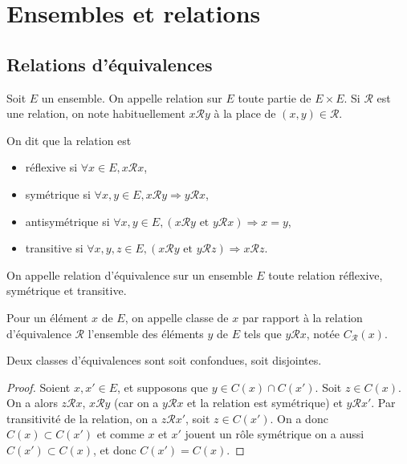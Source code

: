 \section{Ensembles et relations}

\subsection{Relations d'équivalences}

\begin{de}
Soit $E$ un ensemble. On appelle relation sur $E$ toute
partie de $E \times E$. Si $\mathcal{R}$ est une relation, on note habituellement $x\mathcal{R}y$ à la
place de $(x,y) \in\mathcal{R}$.

On dit que la relation est

\begin{itemize}

\item
  réflexive si $\forall x \in E, x\mathcal{R}x$,
\item
  symétrique si $\forall x,y \in E, x\mathcal{R}y \Rightarrow y\mathcal{R}x$,
\item
  antisymétrique si $\forall x,y \in E, (x\mathcal{R}y\text{ et } y\mathcal{R}x) \Rightarrow x = y$,
\item
  transitive si $\forall x,y,z \in E, (x\mathcal{R}y\text{ et } y\mathcal{R}z) \Rightarrow x\mathcal{R}z$.
\end{itemize}
\end{de}

\begin{de}
On appelle relation d'équivalence sur un ensemble $E$
toute relation réflexive, symétrique et transitive.
\end{de}

\begin{de}
Pour un élément $x$ de $E$, on appelle classe de $x$ par
rapport à la relation d'équivalence $\mathcal{R}$ l'ensemble des éléments $y$ de $E$
tels que $y\mathcal{R}x$, notée $C_{\mathcal{R}}(x)$.
\end{de}

\begin{prop}
Deux classes d'équivalences sont soit confondues, soit
disjointes.
\end{prop}

\begin{proof}
Soient $x,x' \in E$, et supposons que $y \in C(x) \cap C(x')$. Soit $z \in C(x)$. On a alors $z\mathcal{R}x$, $x\mathcal{R}y$ (car on a $y\mathcal{R}x$ et la relation est symétrique)
et $y\mathcal{R}x'$. Par transitivité de la relation, on a $z\mathcal{R}x'$, soit $z \in C(x')$. On a
donc $C(x) \subset C(x')$ et comme $x$ et $x'$ jouent un rôle symétrique on a aussi
$C(x') \subset C(x)$, et donc $C(x') = C(x)$.
\end{proof}

